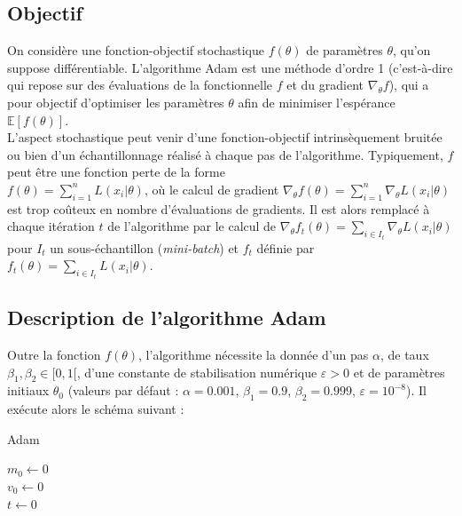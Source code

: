 \documentclass[11pt,a4paper, french]{article}
\newcommand{\dsum}[2]{\displaystyle\sum_{#1}^{#2}}
\begin{document}
\subsection{Objectif}
On considère une fonction-objectif stochastique $f(\theta)$ de paramètres $\theta$, qu'on suppose différentiable. L'algorithme Adam est une méthode d'ordre 1 (c'est-à-dire qui repose sur des évaluations de la fonctionnelle $f$ et du gradient $\nabla_{\theta}f$), qui a pour objectif d'optimiser les paramètres $\theta$ afin de minimiser l'espérance $\mathbb E[f(\theta)]$. \\
L'aspect stochastique peut venir d'une fonction-objectif intrinsèquement bruitée ou bien d'un échantillonnage réalisé à chaque pas de l'algorithme. Typiquement, $f$ peut être une fonction perte de la forme \\$f(\theta)=\dsum{i=1}nL(x_i|\theta)$, où le calcul de gradient $\nabla_{\theta}f(\theta)=\dsum{i=1}n\nabla_{\theta}L(x_i|\theta)$ est trop coûteux en nombre d'évaluations de gradients. Il est alors remplacé à chaque itération $t$ de l'algorithme par le calcul de $\nabla_{\theta}f_t(\theta)=\dsum{i\in I_t}{}\nabla_{\theta}L(x_i|\theta)$ pour $I_t$ un sous-échantillon (\textit{mini-batch}) et $f_t$ définie par $f_t(\theta)=\dsum{i\in I_t}{}L(x_i|\theta)$.

\subsection{Description de l'algorithme Adam}

Outre la fonction $f(\theta)$, l'algorithme nécessite la donnée d'un pas $\alpha$, de taux $\beta_1,\beta_2\in[0,1[$, d'une constante de stabilisation numérique $\varepsilon>0$ et de paramètres initiaux $\theta_0$ (valeurs par défaut : $\alpha=0.001$, $\beta_1=0.9$, $\beta_2=0.999$, $\varepsilon=10^{-8}$). Il exécute alors le schéma suivant :


\begin{algorithm}
  \caption{Adam}
  $m_0\longleftarrow 0$ \\
  $v_0\longleftarrow 0$ \\  
  $t\longleftarrow 0$ \\
\end{algorithm}
\end{document}
